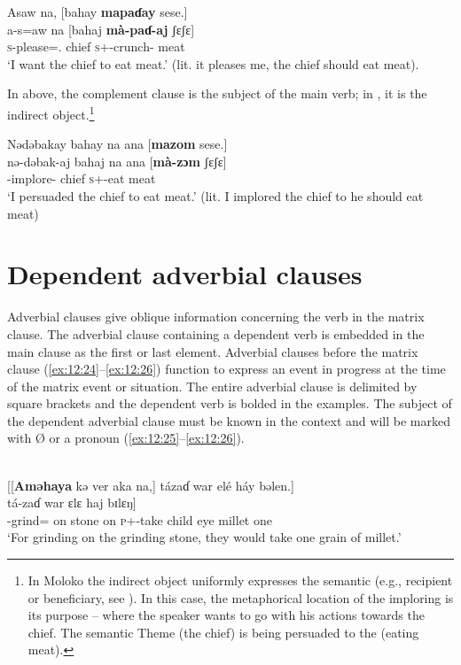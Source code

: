 \ea \label{ex:12:22}
Asaw  na,  [bahay  \textbf{mapaɗay} sese.]\\
\gll  a-s=aw   na   [bahaj   \textbf{mà-paɗ-aj}     ʃɛʃɛ]\\
      \textsc{s}-please={\oneS}.{\IO}  {\PSP}  chief  \textsc{s}+{\HOR}{}-crunch{}-{\CL}  meat\\
\glt  ‘I want the chief to eat meat.’ (lit. it pleases me, the chief should eat meat). 
\z 

In  above, the complement clause is the subject of the main verb; in , it is the indirect object.\footnote{In Moloko the indirect object uniformly expresses the semantic {\LOC} (e.g., recipient or beneficiary, see ). In this case, the metaphorical location of the imploring is its purpose -- where the speaker wants to go with his actions towards the chief. The semantic Theme (the chief) is being persuaded to the {\LOC} (eating meat).} 

\clearpage
\ea \label{ex:12:23}
Nədəbakay  bahay  na  ana  [\textbf{mazom}  sese.]\\
\gll  nə-dəbak-aj   bahaj   na   ana   [\textbf{mà-zɔm}  ʃɛʃɛ]\\
      {\oneS}-implore{}-{\CL}  chief  {\PSP}  {\DAT} \textsc{s}+{\HOR}-eat  meat\\
\glt  ‘I persuaded the chief to eat meat.’ (lit. I implored the chief to he should eat meat)
\z 

\section{Dependent adverbial clauses}\label{sec:12.2}
\hypertarget{RefHeading1213401525720847}{}
Adverbial clauses give oblique information concerning the verb in the matrix clause. The adverbial clause containing a dependent verb is embedded in the main clause as the first or last element. Adverbial clauses before the matrix clause (\ref{ex:12:24}--\ref{ex:12:26}) function to express an event in progress at the time of the matrix event or situation. The entire adverbial clause is delimited by square brackets and the dependent verb is bolded in the examples. The subject of the dependent adverbial clause must be known in the context and will be marked with Ø  or a pronoun (\ref{ex:12:25}--\ref{ex:12:26}). 

\ea \label{ex:12:24}
\\
{}[[\textbf{Aməhaya}  kə  ver  aka  na,]  tázaɗ  war  elé  háy  bəlen.]\\
\gll  [[Ø  \textbf{amə-h=aja}  kə  vɛr  aka  na]  tá-zaɗ          war   ɛlɛ  haj     bɪlɛŋ]\\
      {} {\DEP}-grind={\PLU}  on     stone  on  {\PSP}  \textsc{p}+{\IFV}-take  child   eye  millet  one\\
\glt  ‘For grinding on the grinding stone, they would take one grain of millet.’ 
\z 

